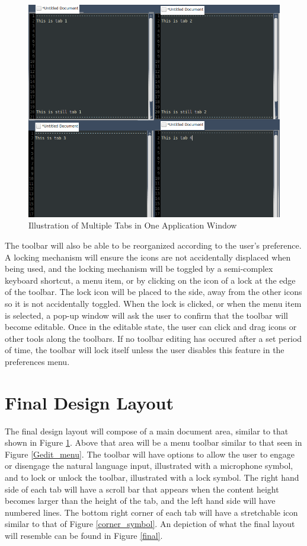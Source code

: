 \documentclass[11pt, oneside]{article}
\begin{document}
\begin{figure}
    \centering
    \includegraphics[width=.8\textwidth]{photos/multitasking_tabs.png}
    \caption{Illustration of Multiple Tabs in One Application Window}
    \label{multitasking_tabs}
\end{figure}

The toolbar will also be able to be reorganized according to the user's preference. A locking mechanism will ensure the icons are not accidentally displaced when being used, and the locking mechanism will be toggled by a semi-complex keyboard shortcut, a menu item, or by clicking on the icon of a lock at the edge of the toolbar. The lock icon will be placed to the side, away from the other icons so it is not accidentally toggled. When the lock is clicked, or when the menu item is selected, a pop-up window will ask the user to confirm that the toolbar will become editable. Once in the editable state, the user can click and drag icons or other tools along the toolbars. If no toolbar editing has occured after a set period of time, the toolbar will lock itself unless the user disables this feature in the preferences menu. 

\section{Final Design Layout}
The final design layout will compose of a main document area, similar to that shown in Figure \ref{multitasking_tabs}. Above that area will be a menu toolbar similar to that seen in Figure \ref{Gedit_menu}. The toolbar will have options to allow the user to engage or disengage the natural language input, illustrated with a microphone symbol, and to lock or unlock the toolbar, illustrated with a lock symbol. The right hand side of each tab will have a scroll bar that appears when the content height becomes larger than the height of the tab, and the left hand side will have numbered lines. The bottom right corner of each tab will have a stretchable icon similar to that of Figure \ref{corner_symbol}. An depiction of what the final layout will resemble can be found in Figure \ref{final}.
\end{document}
